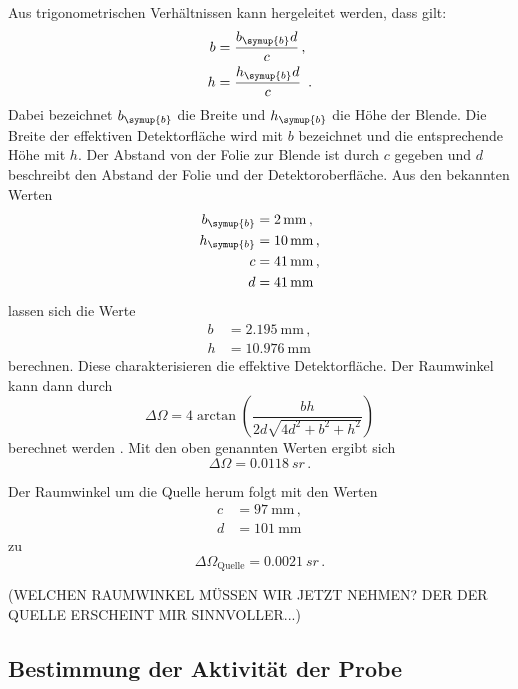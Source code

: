 Aus trigonometrischen Verhältnissen kann hergeleitet werden, dass gilt:
\begin{align*}
  b &= \frac{b_{\symup{b}} d}{c} \,,\\
  h &= \frac{h_{\symup{b}} d}{c} \,.
\end{align*}
Dabei bezeichnet $b_{\symup{b}}$ die Breite und $h_{\symup{b}}$ die Höhe der Blende.
Die Breite der effektiven Detektorfläche wird mit $b$ bezeichnet und die entsprechende Höhe mit $h$.
Der Abstand von der Folie zur Blende ist durch $c$ gegeben und $d$ beschreibt den Abstand
der Folie und der Detektoroberfläche. Aus den bekannten Werten \cite{Versuchsanleitung}
\begin{align*}
  b_{\symup{b}} &= \SI{2}{\milli\meter} \,, \\
  h_{\symup{b}} &= \SI{10}{\milli\meter} \,, \\
  c &= \SI{41}{\milli\meter} \,,\\
  d &= \SI{41}{\milli\meter}
\end{align*}
lassen sich die Werte
\begin{align*}
  b &= \SI{2.195}{\milli\meter} \,,\\
  h &= \SI{10.976}{\milli\meter}
\end{align*}
berechnen. Diese charakterisieren die effektive Detektorfläche. Der Raumwinkel kann dann durch
\begin{equation}
  \Delta \Omega = 4 \arctan\left(\frac{b h}{2d \sqrt{4d^2 + b^2 + h^2}}\right)
\end{equation}
berechnet werden \cite{raumwinkel}. Mit den oben genannten Werten ergibt sich
\begin{equation*}
  \Delta \Omega = \SI{0.0118}{sr} \,.
\end{equation*}

Der Raumwinkel um die Quelle herum folgt mit den Werten \cite{Versuchsanleitung}
\begin{align*}
  c &= \SI{97}{\milli\meter} \,, \\
  d &= \SI{101}{\milli\meter}
\end{align*}
zu
\begin{equation*}
  \Delta \Omega_\text{Quelle} = \SI{0.0021}{sr} \,.
\end{equation*}

(WELCHEN RAUMWINKEL MÜSSEN WIR JETZT NEHMEN? DER DER QUELLE ERSCHEINT MIR SINNVOLLER...)

\subsection{Bestimmung der Aktivität der Probe}
\label{subsec:aktivitaet}

